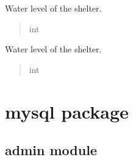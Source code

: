 \documentclass[letterpaper,10pt,english]{sphinxmanual}
\begin{document}
\begin{fulllineitems}
\begin{fulllineitems}
\label{\detokenize{app.models:app.models.shelter.Shelter.waterLevel}}
\pysigstartsignatures
\pysigline
{}
\pysigstopsignatures
\sphinxAtStartPar
Water level of the shelter.
\begin{quote}\begin{description}
\sphinxAtStartPar
int

\end{description}\end{quote}

\end{fulllineitems}


\begin{fulllineitems}
\label{\detokenize{app.models:app.models.shelter.Shelter.radiationLevel}}
\pysigstartsignatures
\pysigline
{}
\pysigstopsignatures
\sphinxAtStartPar
Water level of the shelter.
\begin{quote}\begin{description}
\sphinxAtStartPar
int

\end{description}\end{quote}

\end{fulllineitems}


\end{fulllineitems}


\sphinxstepscope


\chapter{mysql package}
\label{\detokenize{app.mysql:mysql-package}}\label{\detokenize{app.mysql::doc}}

\section{admin module}
\label{\detokenize{app.mysql:module-app.mysql.admin}}\label{\detokenize{app.mysql:admin-module}}
\end{document}
